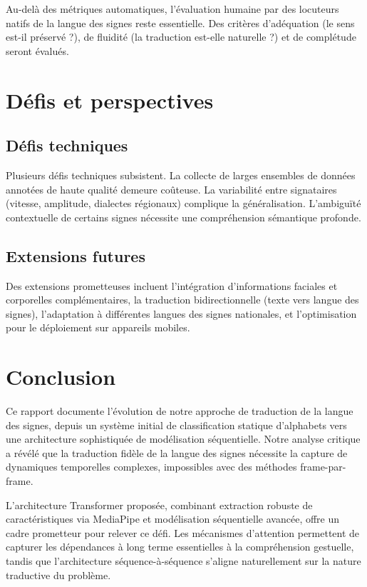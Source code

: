 \documentclass[twocolumn]{el-author}
\begin{document}
Au-delà des métriques automatiques, l'évaluation humaine par des locuteurs natifs de la langue des signes reste essentielle. Des critères d'adéquation (le sens est-il préservé ?), de fluidité (la traduction est-elle naturelle ?) et de complétude seront évalués.

\section{Défis et perspectives}

\subsection{Défis techniques}

Plusieurs défis techniques subsistent. La collecte de larges ensembles de données annotées de haute qualité demeure coûteuse. La variabilité entre signataires (vitesse, amplitude, dialectes régionaux) complique la généralisation. L'ambiguïté contextuelle de certains signes nécessite une compréhension sémantique profonde.

\subsection{Extensions futures}

Des extensions prometteuses incluent l'intégration d'informations faciales et corporelles complémentaires, la traduction bidirectionnelle (texte vers langue des signes), l'adaptation à différentes langues des signes nationales, et l'optimisation pour le déploiement sur appareils mobiles.

\section{Conclusion}

Ce rapport documente l'évolution de notre approche de traduction de la langue des signes, depuis un système initial de classification statique d'alphabets vers une architecture sophistiquée de modélisation séquentielle. Notre analyse critique a révélé que la traduction fidèle de la langue des signes nécessite la capture de dynamiques temporelles complexes, impossibles avec des méthodes frame-par-frame.

L'architecture Transformer proposée, combinant extraction robuste de caractéristiques via MediaPipe et modélisation séquentielle avancée, offre un cadre prometteur pour relever ce défi. Les mécanismes d'attention permettent de capturer les dépendances à long terme essentielles à la compréhension gestuelle, tandis que l'architecture séquence-à-séquence s'aligne naturellement sur la nature traductive du problème.
\end{document}
